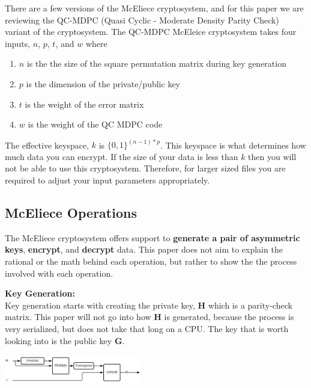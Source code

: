 \documentclass[conference]{IEEEtran}
\begin{document}
    
        There are a few versions of the McEliece cryptosystem, and for this paper we are reviewing the QC-MDPC (Quasi Cyclic - Moderate Density Parity Check) variant of the cryptosystem. The QC-MDPC McEleice cryptosystem takes four inputs, $n$, $p$, $t$, and $w$ where
    
        \begin{enumerate}
            \item $n$ is the the size of the square permutation matrix during key generation
            \item $p$ is the dimension of the private/public key
            \item $t$ is the weight of the error matrix
            \item $w$ is the weight of the QC MDPC code
        \end{enumerate}
        
        The effective keyspace, $k$ is $\{0,1\}^{(n-1)*p}$. This keyspace is what determines how much data you can encrypt. If the size of your data is less than $k$ then you will not be able to use this cryptosystem. Therefore, for larger sized files you are required to adjust your input parameters appropriately.
    \subsection{McEliece Operations}\label{McEliece Operations}
        The McEliece cryptosystem offers support to \textbf{generate a pair of asymmetric keys}, \textbf{encrypt}, and \textbf{decrypt} data. This paper does not aim to explain the rational or the math behind each operation, but rather to show the the process involved with each operation.
    
        \textbf{Key Generation:}\label{Key Generation} \\
            Key generation starts with creating the private key, \textbf{H} which is a parity-check matrix. This paper will not go into how \textbf{H} is generated, because the process is very serialized, but does not take that long on a CPU. The key that is worth looking into is the public key \textbf{G}.
            
            \begin{center}
                \includegraphics[width=0.45\textwidth]{Keygen.png}
                \label{fig:keygen}
            \end{center}          
            
\end{document}
